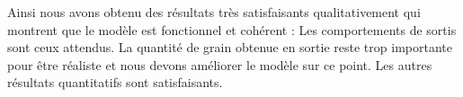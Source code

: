 Ainsi nous avons obtenu des résultats très satisfaisants qualitativement qui montrent que le modèle est fonctionnel et cohérent : Les comportements de sortis sont ceux attendus. La quantité de grain obtenue en sortie reste trop importante pour être réaliste et nous devons améliorer le modèle sur ce point. Les autres résultats quantitatifs sont satisfaisants.